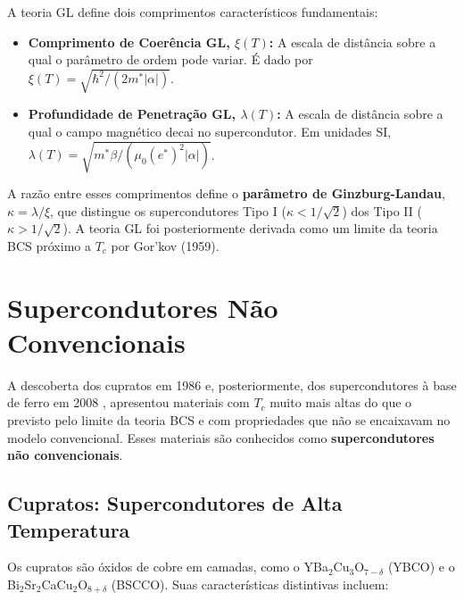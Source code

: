 \documentclass[12pt, a4paper, oneside]{report}
\begin{document}
A teoria GL define dois comprimentos característicos fundamentais:

\begin{itemize}
    \item \textbf{Comprimento de Coerência GL, $\xi(T)$:} A escala de distância sobre a qual o parâmetro de ordem pode variar. É dado por $\xi(T) = \sqrt{\hbar^2 / (2m^* |\alpha|)}$.
    \item \textbf{Profundidade de Penetração GL, $\lambda(T)$:} A escala de distância sobre a qual o campo magnético decai no supercondutor. Em unidades SI, $\lambda(T) = \sqrt{m^* \beta / (\mu_0 (e^*)^2 |\alpha|)}$.
\end{itemize}

A razão entre esses comprimentos define o \textbf{parâmetro de Ginzburg-Landau}, $\kappa = \lambda / \xi$, que distingue os supercondutores Tipo I ($\kappa < 1/\sqrt{2}$) dos Tipo II ($\kappa > 1/\sqrt{2}$). A teoria GL foi posteriormente derivada como um limite da teoria BCS próximo a $T_c$ por Gor'kov (1959).

\section{Supercondutores Não Convencionais}

A descoberta dos cupratos em 1986 \cite{bednorz1986} e, posteriormente, dos supercondutores à base de ferro em 2008 \cite{kamihara2008}, apresentou materiais com $T_c$ muito mais altas do que o previsto pelo limite da teoria BCS e com propriedades que não se encaixavam no modelo convencional. Esses materiais são conhecidos como \textbf{supercondutores não convencionais}.

\subsection{Cupratos: Supercondutores de Alta Temperatura}

Os cupratos são óxidos de cobre em camadas, como o YBa$_2$Cu$_3$O$_{7-\delta}$ (YBCO) e o Bi$_2$Sr$_2$CaCu$_2$O$_{8+\delta}$ (BSCCO). Suas características distintivas incluem:
\end{document}
